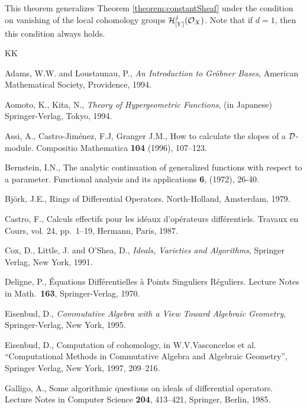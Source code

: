 \documentclass[12pt]{article}
\def\Dsc{ {\cal D} }
\def\Hsc{ {\cal H} }
\def\Osc{ {\cal O} }
\begin{document}
This theorem generalizes Theorem \ref{theorem:constantSheaf} 
under the condition on vanishing of the local cohomology groups
$\Hsc_{[Y]}^j(\Osc_X)$. 
Note that if $d=1$, then this condition always holds.

\begin{thebibliography}{KK}


 Adams, W.W. and Loustaunau, P.,
{\it An Introduction to Gr\"obner Bases},
American Mathematical Society, Providence, 1994.

Aomoto, K., Kita, N.,
{\it Theory of Hypergeometric Functions}, (in Japanese)
Springer-Verlag, Tokyo, 1994.


 Assi, A., Castro-Jim\'enez, F.J, Granger J.M.,
How to calculate the slopes of a $\Dsc$-module. 
Compositio Mathematica {\bf 104} (1996), 107--123. 

 Bernstein, I.N.,
The analytic continuation of generalized functions with 
respect to a parameter.
Functional analysis and its applications {\bf 6}, (1972), 26-40.

 Bj\"{o}rk, J.E., 
Rings of Differential Operators. 
North-Holland, Amsterdam,  1979.

 Castro, F.,  
Calculs effectifs pour les id\'eaux d'op\'erateurs diff\'erentiels.
Travaux en Cours, vol. 24,  
pp.\ 1--19, Hermann, Paris, 1987.

 Cox, D., Little, J. and O'Shea, D.,
{\it Ideals, Varieties and Algorithms},
Springer Verlag, New York, 1991.

 Deligne, P.,
\'Equations Diff\'erentielles \`a Points Singuliers R\'eguliers.  
Lecture Notes in Math.\ {\bf 163}, Springer-Verlag, 1970.


 Eisenbud, D.,
{\it Commutative Algebra with a View Toward Algebraic Geometry},
Springer-Verlag, New York, 1995.

 Eisenbud, D.,
Computation of cohomology,
in W.V.Vasconcelos et al. ``Computational Methods in Commutative Algebra and
Algebraic Geometry'', Springer Verlag, New York, 1997, 209--216.

 Galligo, A.,  
Some algorithmic questions on ideals of differential operators.
Lecture Notes in Computer Science {\bf 204}, 413--421,
Springer, Berlin, 1985.


\end{thebibliography}
\end{document}
